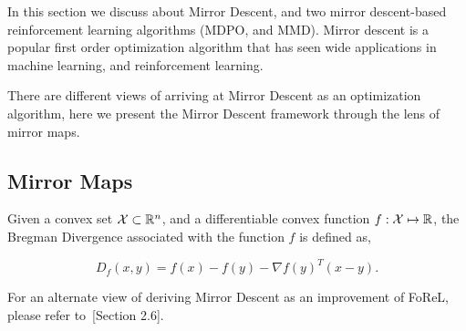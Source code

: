 In this section we discuss about Mirror Descent, and two mirror descent-based reinforcement
learning algorithms (MDPO, and MMD).
Mirror descent is a popular first order optimization algorithm that has seen wide applications in
machine learning, and reinforcement learning.

There are different views of arriving at Mirror Descent as an optimization algorithm, here we
present the Mirror Descent framework through the lens of mirror maps.

\subsection{Mirror Maps}

\begin{definition}
	\label{def:bregman}
	Given a convex set $\mathcal{X} \subset \mathbb{R}^n$, and a differentiable convex function $f: \mathcal{X} \mapsto
		\mathbb{R}$, the Bregman Divergence associated with the function $f$ is defined as,

	$$
		D_f(x, y) = f(x) - f(y) - \nabla f(y)^T (x-y).
	$$
\end{definition}

For an alternate view of deriving Mirror Descent as an improvement of FoReL, please refer
to~\cite{shalev-shwartzOnline2012}[Section 2.6].
